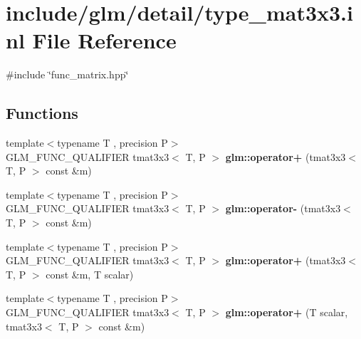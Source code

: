 \hypertarget{type__mat3x3_8inl}{}\section{include/glm/detail/type\+\_\+mat3x3.inl File Reference}
\label{type__mat3x3_8inl}
{\ttfamily \#include \char`\"{}func\+\_\+matrix.\+hpp\char`\"{}}\newline
\subsection*{Functions}
\begin{DoxyCompactItemize}
\item 
\mbox{\label{type__mat3x3_8inl_a1a84bec33e1d2b50b7707e1b5dcba723}} 
{\footnotesize template$<$typename T , precision P$>$ }\\G\+L\+M\+\_\+\+F\+U\+N\+C\+\_\+\+Q\+U\+A\+L\+I\+F\+I\+ER tmat3x3$<$ T, P $>$ {\bfseries glm\+::operator+} (tmat3x3$<$ T, P $>$ const \&m)
\item 
\mbox{\label{type__mat3x3_8inl_a0106ce96b46df77919c888f5a454cc40}} 
{\footnotesize template$<$typename T , precision P$>$ }\\G\+L\+M\+\_\+\+F\+U\+N\+C\+\_\+\+Q\+U\+A\+L\+I\+F\+I\+ER tmat3x3$<$ T, P $>$ {\bfseries glm\+::operator-\/} (tmat3x3$<$ T, P $>$ const \&m)
\item 
\mbox{\label{type__mat3x3_8inl_a0730719ff564c6144ad4613adf295ae2}} 
{\footnotesize template$<$typename T , precision P$>$ }\\G\+L\+M\+\_\+\+F\+U\+N\+C\+\_\+\+Q\+U\+A\+L\+I\+F\+I\+ER tmat3x3$<$ T, P $>$ {\bfseries glm\+::operator+} (tmat3x3$<$ T, P $>$ const \&m, T scalar)
\item 
\mbox{\label{type__mat3x3_8inl_af74574356535672735c0cf2e5820f858}} 
{\footnotesize template$<$typename T , precision P$>$ }\\G\+L\+M\+\_\+\+F\+U\+N\+C\+\_\+\+Q\+U\+A\+L\+I\+F\+I\+ER tmat3x3$<$ T, P $>$ {\bfseries glm\+::operator+} (T scalar, tmat3x3$<$ T, P $>$ const \&m)
\item 
\mbox{\label{type__mat3x3_8inl_a356ed6fa88f4ee6805c31b33ad9e4cd7}} 

\end{DoxyCompactItemize}
